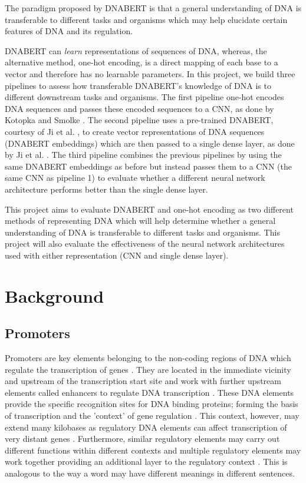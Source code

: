 \documentclass{article}
\begin{document}
The paradigm proposed by DNABERT is that a general understanding of DNA is transferable to different tasks and organisms which may help elucidate certain features of DNA and its regulation. 

DNABERT can \textit{learn} representations of sequences of DNA, whereas, the alternative method, one-hot encoding, is a direct mapping of each base to a vector and therefore has no learnable parameters. In this project, we build three pipelines to assess how transferable DNABERT's knowledge of DNA is to different downstream tasks and organisms. The first pipeline one-hot encodes DNA sequences and passes these encoded sequences to a CNN, as done by Kotopka and Smolke \cite{smolke2020promoter}. The second pipeline uses a pre-trained DNABERT, courtesy of Ji et al. \cite{dnabert2020}, to create vector representations of DNA sequences (DNABERT embeddings) which are then passed to a single dense layer, as done by Ji et al. \cite{dnabert2020}. The third pipeline combines the previous pipelines by using the same DNABERT embeddings as before but instead passes them to a CNN (the same CNN as pipeline 1) to evaluate whether a different neural network architecture performs better than the single dense layer.

This project aims to evaluate DNABERT and one-hot encoding as two different methods of representing DNA which will help determine whether a general understanding of DNA is transferable to different tasks and organisms. This project will also evaluate the effectiveness of the neural network architectures used with either representation (CNN and single dense layer).
 

\section{Background}
\subsection{Promoters}
Promoters are key elements belonging to the non-coding regions of DNA which regulate the transcription of genes \cite{oubounyt2019dee, ayoubi1996altprom}. They are located in the immediate vicinity and upstream of the transcription start site \cite{oubounyt2019dee, Gibcus2012} and work with further upstream elements called enhancers to regulate DNA transcription \cite{Gibcus2012}. These DNA elements provide the specific recognition sites for DNA binding proteins; forming the basis of transcription and the 'context' of gene regulation \cite{Gibcus2012}. This context, however, may extend many kilobases as regulatory DNA elements can affect transcription of very distant genes \cite{Gibcus2012}. Furthermore, similar regulatory elements may carry out different functions within different contexts and multiple regulatory elements may work together providing an additional layer to the regulatory context \cite{dnabert2020, davuluri2008altprommammal}. This is analogous to the way a word may have different meanings in different sentences. 
\end{document}
